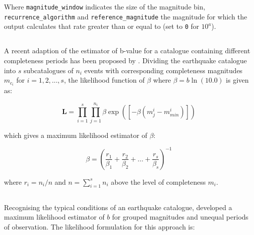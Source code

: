 Where \verb=magnitude_window= indicates the size of the magnitude bin, \verb=recurrence_algorithm= and \verb=reference_magnitude= the magnitude for which the output calculates that rate greater than or equal to (set to \verb=0= for $10^{a}$). 

\subsection{\textcite{KijkoSmit2012}}

A recent adaption of the \textcite{Aki1965} estimator of b-value for  a catalogue containing different completeness periods has been proposed by \textcite{KijkoSmit2012}. Dividing the earthquake catalogue into $s$ subcatalogues of $n_i$ events with corresponding completeness magnitudes $m_{c_i}$ for $i = 1, 2, ..., s$, the likelihood function of $\beta$ where $\beta = b \ln		 \left( {10.0} \right)$ is given as:

\begin{equation}
    \mathbf{L} = \prod_{i = 1}^{s} \prod_{j = 1}^{n_i} \beta \exp(\left[ {-\beta \left( {m_j^i - m_{min}^i } \right) } \right])
\end{equation}

\noindent which gives a maximum likelihood estimator of $\beta$:

\begin{equation}
    \beta = \left( {\frac{r_1}{\beta_1} + \frac{r_2}{\beta_2} + \dots + \frac{r_s}{\beta_s}} \right)^{-1}
\end{equation}

\noindent where $r_i = n_i / n$ and $n = \sum_{i = 1}^{s} n_i$ above the level of completeness $m_i$.

\begin{python}[frame=single]]

>> kijko_smit_config = {'magnitude_interval': 0.1,
                        'reference_magnitude': None\}
\end{python}

\subsection{\textcite{Weichert1980}}

Recognising the typical conditions of an earthquake catalogue, \textcite{Weichert1980} developed a maximum likelihood estimator of $b$ for grouped magnitudes and unequal periods of observation. The likelihood formulation for this approach is:

